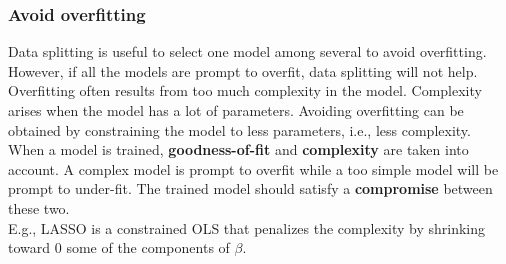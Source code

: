 \begin{frame}
\frametitle{Avoid overfitting}
Data splitting is useful to select one model among several to avoid overfitting. However, if all the models are prompt to overfit, data splitting will not help. \\
\vspace{0.3cm}
Overfitting often results from too much complexity in the model. Complexity arises when the model has a lot of parameters. Avoiding overfitting can be obtained by constraining the model to less parameters, i.e., less complexity.\\ 
\vspace{0.3cm}
When a model is trained, {\bf goodness-of-fit} and {\bf complexity} are taken into account. A complex model is prompt to overfit while a too simple model will be prompt to under-fit. The trained model should satisfy a {\bf compromise} between these two.\\
\vspace{0.3cm}
E.g., LASSO is a constrained OLS that penalizes the complexity by shrinking toward $0$ some of the components of $\beta$.
\end{frame}
